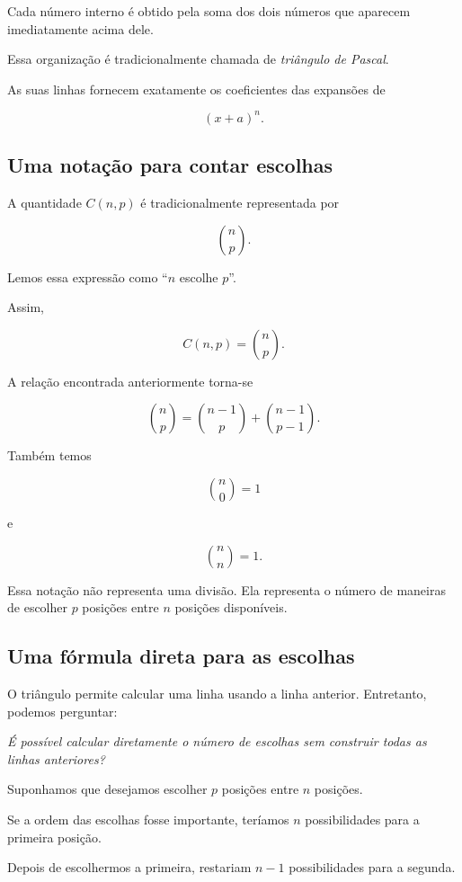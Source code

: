 \documentclass[12pt,a4paper]{article}
\begin{document}
Cada número interno é obtido pela soma dos dois números que aparecem
imediatamente acima dele.

Essa organização é tradicionalmente chamada de \emph{triângulo de
Pascal}.

As suas linhas fornecem exatamente os coeficientes das expansões de

\[
(x+a)^n.
\]

\subsection{Uma notação para contar escolhas}

A quantidade \(C(n,p)\) é tradicionalmente representada por

\[
\binom{n}{p}.
\]

Lemos essa expressão como ``\(n\) escolhe \(p\)''.

Assim,

\[
C(n,p)=\binom{n}{p}.
\]

A relação encontrada anteriormente torna-se

\[
\binom{n}{p}
=
\binom{n-1}{p}
+
\binom{n-1}{p-1}.
\]

Também temos

\[
\binom{n}{0}=1
\]

e

\[
\binom{n}{n}=1.
\]

Essa notação não representa uma divisão. Ela representa o número de
maneiras de escolher \(p\) posições entre \(n\) posições disponíveis.

\subsection{Uma fórmula direta para as escolhas}

O triângulo permite calcular uma linha usando a linha anterior.
Entretanto, podemos perguntar:

\begin{center}
\emph{É possível calcular diretamente o número de escolhas sem construir
todas as linhas anteriores?}
\end{center}

Suponhamos que desejamos escolher \(p\) posições entre \(n\) posições.

Se a ordem das escolhas fosse importante, teríamos \(n\) possibilidades
para a primeira posição.

Depois de escolhermos a primeira, restariam \(n-1\) possibilidades para
a segunda.
\end{document}

